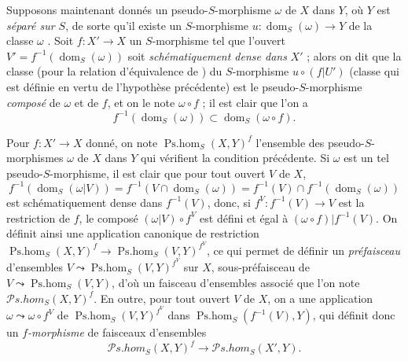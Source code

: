 \begin{env}[20.3.2]
Supposons maintenant donnés un pseudo-$S$-morphisme $\omega$ de $X$ dans $Y$, où $Y$ est \emph{séparé sur $S$}, de sorte qu'il existe un $S$-morphisme $u:\operatorname{dom}_S(\omega)\to Y$ de la classe $\omega$ .
Soit $f:X'\to X$ un $S$-morphisme tel que l'ouvert $V'=f^{-1}(\operatorname{dom}_S(\omega))$ soit \emph{schématiquement dense dans} $X'$ ; alors on dit que la classe (pour la relation d'équivalence de ) du $S$-morphisme $u\circ(f|U')$ (classe qui est définie en vertu de l'hypothèse précédente) est le pseudo-$S$-morphisme \emph{composé} de $\omega$ et de $f$, et on le note $\omega\circ f$ ; il est clair que l'on a
\[
\label{IV.20.3.2.1}
  f^{-1}(\operatorname{dom}_S(\omega))\subset\operatorname{dom}_S(\omega\circ f).
  \tag{20.3.2.1}
\]

Pour $f:X'\to X$ donné, on note $\operatorname{Ps.hom}_S(X,Y)^f$ l'ensemble des pseudo-$S$-morphismes $\omega$ de $X$ dans $Y$ qui vérifient la condition précédente.
Si $\omega$ est un tel pseudo-$S$-morphisme, il est clair que pour tout ouvert $V$ de $X$,
\[
  f^{-1}(\operatorname{dom}_S(\omega|V))=f^{-1}(V\cap\operatorname{dom}_S(\omega))=f^{-1}(V)\cap f^{-1}(\operatorname{dom}_S(\omega))
\]
est schématiquement dense dans $f^{-1}(V)$, donc, si $f^V:f^{-1}(V)\to V$ est la restriction de $f$, le composé $(\omega|V)\circ f^V$ est défini et égal à $(\omega\circ f)|f^{-1}(V)$.
On définit ainsi une
application canonique de restriction $\operatorname{Ps.hom}_S(X,Y)^f\to\operatorname{Ps.hom}_S(V,Y)^{f^V}$, ce qui permet de définir un \emph{préfaisceau} d'ensembles $V\leadsto\operatorname{Ps.hom}_S(V,Y)^{f^V}$ sur $X$, sous-préfaisceau de $V\leadsto\operatorname{Ps.hom}_S(V,Y)$, d'où un faisceau d'ensembles associé que l'on note $\mathscr{P}\!s.\mathit{hom}_S(X,Y)^f$.
En outre, pour tout ouvert $V$ de $X$, on a une application $\omega\leadsto\omega\circ f^V$ de $\operatorname{Ps.hom}_S(V,Y)^{f^V}$ dans $\operatorname{Ps.hom}_S(f^{-1}(V),Y)$, qui définit donc un \emph{$f$-morphisme} de faisceaux d'ensembles
\[
  \mathscr{P}\!s.\mathit{hom}_S(X,Y)^f\to\mathscr{P}\!s.\mathit{hom}_S(X',Y).
\]
\end{env}

